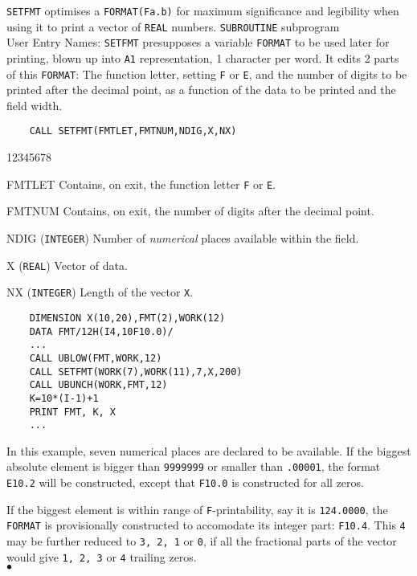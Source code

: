                    
                  
\Submitter{}                
\begin{center}
\end{center}
{\tt SETFMT} optimises a {\tt FORMAT(Fa.b)} for maximum significance and
legibility when using it to print a vector of {\tt REAL} numbers.
\Structure
{\tt SUBROUTINE} subprogram \\
User Entry Names: 
\Usage
{\tt SETFMT} presupposes a variable {\tt FORMAT} to be used later for
printing, blown up into {\tt A1} representation, 1 character per word.
It edits 2 parts of this {\tt FORMAT}: The function letter, setting
{\tt F} or {\tt E}, and the number of digits to be printed after
the decimal point, as a function of the data to be printed and the
field width.
\begin{verbatim}
    CALL SETFMT(FMTLET,FMTNUM,NDIG,X,NX)
\end{verbatim}
\begin{DLtt}{12345678}
\item[FMTLET] Contains, on exit, the function letter {\tt F} or {\tt E}.
\item[FMTNUM] Contains, on exit, the number of digits after the
decimal point.
\item[NDIG] ({\tt INTEGER}) Number of {\it numerical} places available
within the field.
\item[X] ({\tt REAL}) Vector of data.
\item[NX] ({\tt INTEGER}) Length of the vector {\tt X}.
\end{DLtt}
\Examples
\begin{verbatim}
    DIMENSION X(10,20),FMT(2),WORK(12)
    DATA FMT/12H(I4,10F10.0)/
    ...
    CALL UBLOW(FMT,WORK,12)
    CALL SETFMT(WORK(7),WORK(11),7,X,200)
    CALL UBUNCH(WORK,FMT,12)
    K=10*(I-1)+1
    PRINT FMT, K, X
    ...
\end{verbatim}
In this example, seven numerical places are declared to be
available. If the biggest absolute element is bigger than {\tt 9999999}
or smaller than {\tt .00001}, the format {\tt E10.2} will be constructed,
except that {\tt F10.0} is constructed for all zeros.
\par
If the biggest element is within range of {\tt F}-printability,
say it is {\tt 124.0000}, the {\tt FORMAT} is provisionally constructed
to accomodate its integer part: {\tt F10.4}. This {\tt 4} may be further
reduced to {\tt 3, 2, 1} or {\tt 0}, if all the fractional parts of the
vector would give {\tt 1, 2, 3} or {\tt 4} trailing zeros.
\\ $\bullet$
